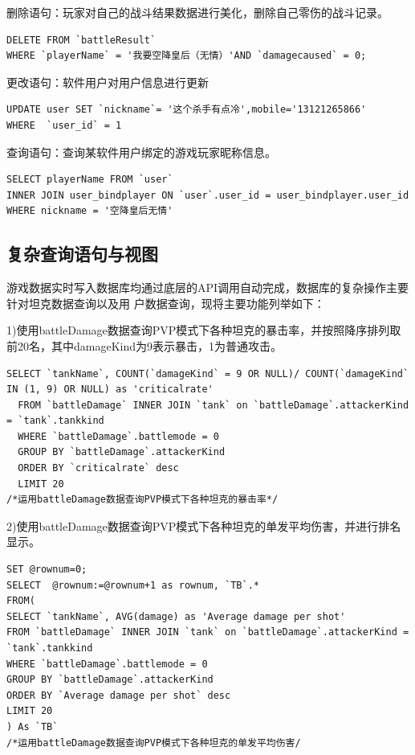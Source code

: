 \documentclass[UTF8, a4paper]{ctexart}
\begin{document}
删除语句：玩家对自己的战斗结果数据进行美化，删除自己零伤的战斗记录。
\begin{lstlisting}[style=A]
DELETE FROM `battleResult`
WHERE `playerName` = '我要空降皇后（无情）'AND `damagecaused` = 0;
\end{lstlisting}

更改语句：软件用户对用户信息进行更新
\begin{lstlisting}[style=A]
UPDATE user SET `nickname`= '这个杀手有点冷',mobile='13121265866' 
WHERE  `user_id` = 1
\end{lstlisting}

查询语句：查询某软件用户绑定的游戏玩家昵称信息。
\begin{lstlisting}[style=A]
SELECT playerName FROM `user` 
INNER JOIN user_bindplayer ON `user`.user_id = user_bindplayer.user_id
WHERE nickname = '空降皇后无情'
\end{lstlisting}

\subsection{复杂查询语句与视图}
游戏数据实时写入数据库均通过底层的API调用自动完成，数据库的复杂操作主要针对坦克数据查询以及用
户数据查询，现将主要功能列举如下：

1)使用battleDamage数据查询PVP模式下各种坦克的暴击率，并按照降序排列取前20名，其中damageKind为9表示暴击，1为普通攻击。

\begin{lstlisting}[style=A]
  SELECT `tankName`, COUNT(`damageKind` = 9 OR NULL)/ COUNT(`damageKind` IN (1, 9) OR NULL) as 'criticalrate'
  FROM `battleDamage` INNER JOIN `tank` on `battleDamage`.attackerKind = `tank`.tankkind
  WHERE `battleDamage`.battlemode = 0
  GROUP BY `battleDamage`.attackerKind
  ORDER BY `criticalrate` desc
  LIMIT 20
/*运用battleDamage数据查询PVP模式下各种坦克的暴击率*/
\end{lstlisting}

2)使用battleDamage数据查询PVP模式下各种坦克的单发平均伤害，并进行排名显示。
\begin{lstlisting}[style=A]
SET @rownum=0;						
SELECT  @rownum:=@rownum+1 as rownum, `TB`.*
FROM(
SELECT `tankName`, AVG(damage) as 'Average damage per shot'
FROM `battleDamage` INNER JOIN `tank` on `battleDamage`.attackerKind = `tank`.tankkind
WHERE `battleDamage`.battlemode = 0
GROUP BY `battleDamage`.attackerKind
ORDER BY `Average damage per shot` desc
LIMIT 20
) As `TB`
/*运用battleDamage数据查询PVP模式下各种坦克的单发平均伤害/
\end{lstlisting}
\end{document}

